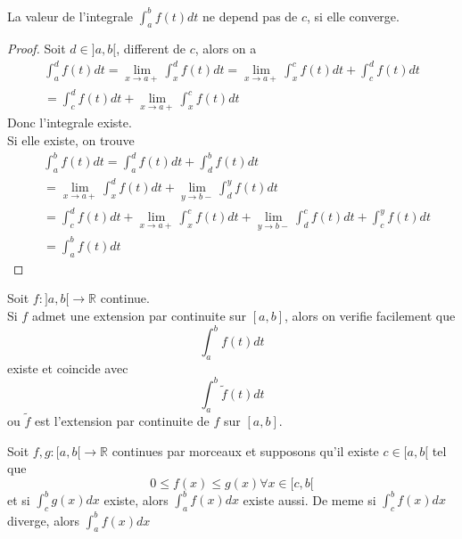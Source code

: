 \documentclass[../main.tex]{subfiles}
\begin{document}
\begin{lemma}
	La valeur de  l'integrale $ \int_{ a }^{ b }f( t) dt$ ne depend pas de $c$, si elle converge.
\end{lemma}
\begin{proof}
	Soit $d \in ]a,b[$, different de $c$, alors on a
	\begin{align*}
	\int_{ a }^{ d }f( t) dt = \lim_{x \to a+}  \int_{ x }^{ d }f( t) dt = \lim_{x \to a+} \int_{ x }^{ c }f( t) dt + \int_{ c }^{ d }f( t) dt\\
	= \int_{ c }^{ d }f( t) dt + \lim_{x \to a+} \int_{ x }^{ c }f( t) dt
	\end{align*}
	Donc l'integrale existe.\\
	Si elle existe, on trouve
	\begin{align*}
		&\int_{ a }^{ b } f( t) dt = \int_{ a }^{ d }f( t) dt + \int_{ d }^{ b }f( t) dt\\
		&= \lim_{x \to a+} \int_{ x }^{ d }f( t) dt + \lim_{y \to b- } \int_{ d }^{ y }f( t) dt\\
		&= \int_{ c }^{ d }f( t) dt + \lim_{x \to a+} \int_{ x }^{ c }f( t) dt + \lim_{y \to b-} \int_{ d }^{ c }f( t) dt + \int_{ c }^{ y }f( t) dt\\
		&= \int_{ a }^{ b } f( t) dt
	\end{align*}
	
	
	
\end{proof}
\begin{rmq}
	Soit  $f:]a,b[\to \mathbb{R}$ continue.\\
	Si $f$ admet une extension par continuite sur $[a,b]$, alors on verifie facilement que 
	\[ 
		\int_{ a }^{ b } f( t) dt
	\]
	existe et coincide avec 
	\[ 
		\int_{ a }^{ b } \tilde f ( t) dt
	\]
	ou $\tilde f$ est l'extension par continuite de $f$ sur $[a,b]$.
\end{rmq}
\begin{lemma}
Soit $f,g:[a,b[\to \mathbb{R}$ continues par morceaux et supposons qu'il existe $c\in [ a,b[ $ tel que 
\[ 
	0\leq f( x) \leq g( x)  \forall x \in [ c,b[ 
\]
et si $\int_{ c }^{ b }g( x) dx$ existe, alors $ \int_{ a }^{ b }f( x) dx$ existe aussi.
De meme si $ \int_{ c }^{ b }f( x) dx$ diverge, alors $ \int_{ a }^{ b }f( x) dx$

\end{lemma}
\end{document}
